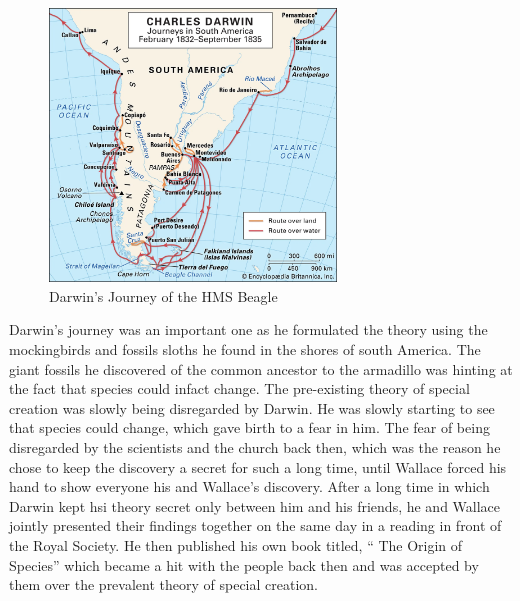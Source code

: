 \documentclass{article}
\begin{document}
\begin{figure}[h]
    \centering
    \includegraphics[width = 3.0in]{map-journeys-Charles-Darwin-South-American-September-1835.jpg}
    \caption{Darwin's Journey of the HMS Beagle}
\end{figure}
\par 
Darwin’s journey was an important one as he formulated the theory using the mockingbirds and fossils sloths he found in the shores of south America. The giant fossils he discovered of the common ancestor to the armadillo was hinting at the fact that species could infact change. The pre-existing theory of special creation was slowly being disregarded by Darwin. He was slowly starting to see that species could change, which gave birth to a fear in him. The fear of being disregarded by the scientists and the church back then, which was the reason he chose to keep the discovery a secret for such a long time, until Wallace forced his hand to show everyone his and Wallace’s discovery. After a long time in which Darwin kept hsi theory secret only between him and his friends, he and Wallace jointly presented their findings together on the same day in a reading in front of the Royal Society. He then published his own book titled, “ The Origin of Species” which became a hit with the people back then and was accepted by them over the prevalent theory of special creation.
\end{document}

